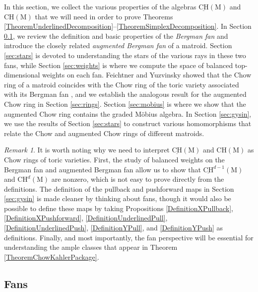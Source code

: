 \documentclass[11pt,reqno]{amsart}
\theoremstyle{definition}
\theoremstyle{remark}
\newtheorem{remark}[theorem]{Remark}
\renewcommand{\(}{\left(}
\renewcommand{\)}{\right)}
\newcommand{\<}{\left<}
\renewcommand{\>}{\right>}
\begin{document}
In this section, we collect the various properties of the algebras $\underline{\mathrm{CH}}(\mathrm{M})$ and $\mathrm{CH}(\mathrm{M})$
that we will need in order to prove Theorems 
\ref{TheoremUnderlinedDecomposition}--\ref{TheoremSimplexDecomposition}.
In Section \ref{sec:fans}, we review the definition and basic properties of the \emph{Bergman fan} and introduce the closely related 
\emph{augmented Bergman fan} of a matroid.
Section \ref{sec:stars} is devoted to understanding the stars of the various rays in these two fans, while Section \ref{sec:weights}
is where we compute the space of balanced top-dimensional weights on each fan.
Feichtner and Yuzvinsky showed that the Chow ring of a matroid coincides with the Chow ring of the toric variety
associated with its Bergman fan \cite[Theorem 3]{FY}, and we establish the analogous result for the augmented Chow ring in Section \ref{sec:rings}.
Section \ref{sec:mobius} is where we show that the augmented Chow ring contains the graded M\"obius algebra.
In Section \ref{sec:gysin}, we use the results of Section \ref{sec:stars} to construct various homomorphisms that relate
the Chow and augmented Chow rings of different matroids. 

\begin{remark}
It is worth noting why we need to interpret $\underline{\mathrm{CH}}(\mathrm{M})$ and $\mathrm{CH}(\mathrm{M})$
as Chow rings of toric varieties.
First, the study of balanced weights on the Bergman fan and augmented Bergman fan allow us to show 
that $\underline{\mathrm{CH}}^{d-1}(\mathrm{M})$ and $\mathrm{CH}^d(\mathrm{M})$ are nonzero, which is not easy to
prove directly from the definitions.
The definition of the pullback and pushforward maps in Section \ref{sec:gysin} is made cleaner by thinking about fans, though it would also
be possible to define these maps by taking Propositions \ref{DefinitionXPullback}, \ref{DefinitionXPushforward}, \ref{DefinitionUnderlinedPull}, \ref{DefinitionUnderlinedPush}, \ref{DefinitionYPull}, and \ref{DefinitionYPush} as definitions. 
Finally, and most importantly, the fan perspective will be essential for understanding
the ample classes that appear in Theorem \ref{TheoremChowKahlerPackage}.
\end{remark}


\subsection{Fans}\label{sec:fans}
\end{document}
